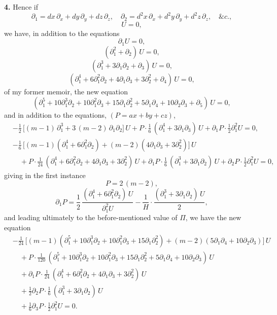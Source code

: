 \documentclass[11pt,a4paper]{article}
\begin{document}
\textbf{4.} Hence if
\[
\partial_{1} = dx\,\partial_{x} + dy\,\partial_{y} + dz\,\partial_{z},\quad \partial_{2} = d^{2}x\,\partial_{x} + d^{2}y\,\partial_{y} + d^{2}z\,\partial_{z},\quad \&c.,
\]
\[
U = 0,
\]
we have, in addition to the equations
\[
\partial_{1}U = 0,
\]
\[
(\partial_{1}^{2} + \partial_{2})\,U = 0,
\]
\[
(\partial_{1}^{3} + 3\partial_{1}\partial_{2} + \partial_{3})\,U = 0,
\]
\[
(\partial_{1}^{4} + 6\partial_{1}^{2}\partial_{2} + 4\partial_{1}\partial_{3} + 3\partial_{2}^{2} + \partial_{4})\,U = 0,
\]
of my former memoir, the new equation
\[
(\partial_{1}^{5} + 10\partial_{1}^{3}\partial_{2} + 10\partial_{1}^{2}\partial_{3} + 15\partial_{1}\partial_{2}^{2} + 5\partial_{1}\partial_{4} + 10\partial_{2}\partial_{3} + \partial_{5})\,U = 0,
\]
and in addition to the equations, $(P = ax + by + cz)$,
\[
\begin{aligned}
&-\tfrac{1}{2}\,\bigl[(m - 1)\,\partial_{1}^{3} + 3\,(m - 2)\,\partial_{1}\partial_{2}\bigr]\,U + P \cdot \tfrac{1}{6}\,(\partial_{1}^{4} + 3\partial_{1}\partial_{3})\,U + \partial_{1}P \cdot \tfrac{1}{2}\partial_{1}^{2}U = 0,\\
&-\tfrac{1}{6}\,\bigl[(m - 1)(\partial_{1}^{4} + 6\partial_{1}^{2}\partial_{2}) + (m - 2)(4\partial_{1}\partial_{3} + 3\partial_{2}^{2})\bigr]\,U\\
&\quad + P \cdot \tfrac{1}{24}\,(\partial_{1}^{4} + 6\partial_{1}^{2}\partial_{2} + 4\partial_{1}\partial_{3} + 3\partial_{2}^{2})\,U + \partial_{1}P \cdot \tfrac{1}{6}\,(\partial_{1}^{3} + 3\partial_{1}\partial_{2})\,U + \partial_{2}P \cdot \tfrac{1}{2}\partial_{1}^{2}U = 0,
\end{aligned}
\]
giving in the first instance
\[
P = 2\,(m - 2),
\]
\[
\partial_{1}P = \frac{1}{2}\,\frac{(\partial_{1}^{4} + 6\partial_{1}^{2}\partial_{2})\,U}{\partial_{1}^{2}U} - \frac{1}{H}\cdot\frac{(\partial_{1}^{3} + 3\partial_{1}\partial_{2})\,U}{2},
\]
and leading ultimately to the before-mentioned value of $\Pi$, we have the new equation
\[
\begin{aligned}
&-\tfrac{1}{24}\,\bigl[(m - 1)(\partial_{1}^{5} + 10\partial_{1}^{3}\partial_{2} + 10\partial_{1}^{2}\partial_{3} + 15\partial_{1}\partial_{2}^{2}) + (m - 2)(5\partial_{1}\partial_{4} + 10\partial_{2}\partial_{3})\bigr]\,U\\
&\quad + P \cdot \tfrac{1}{120}\,(\partial_{1}^{5} + 10\partial_{1}^{3}\partial_{2} + 10\partial_{1}^{2}\partial_{3} + 15\partial_{1}\partial_{2}^{2} + 5\partial_{1}\partial_{4} + 10\partial_{2}\partial_{3})\,U\\
&\quad + \partial_{1}P \cdot \tfrac{1}{24}\,(\partial_{1}^{4} + 6\partial_{1}^{2}\partial_{2} + 4\partial_{1}\partial_{3} + 3\partial_{2}^{2})\,U\\
&\quad + \tfrac{1}{2}\partial_{2}P \cdot \tfrac{1}{6}\,(\partial_{1}^{3} + 3\partial_{1}\partial_{2})\,U\\
&\quad + \tfrac{1}{6}\partial_{3}P \cdot \tfrac{1}{2}\partial_{1}^{2}U = 0.
\end{aligned}
\]
\end{document}
